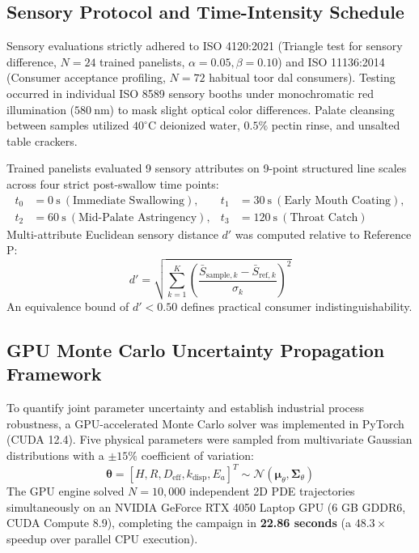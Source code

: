 \documentclass[10pt,a4paper]{article}
\begin{document}
\subsection{Sensory Protocol and Time-Intensity Schedule}
Sensory evaluations strictly adhered to ISO 4120:2021 (Triangle test for sensory difference, $N = 24$ trained panelists, $\alpha = 0.05, \beta = 0.10$) and ISO 11136:2014 (Consumer acceptance profiling, $N = 72$ habitual toor dal consumers). Testing occurred in individual ISO 8589 sensory booths under monochromatic red illumination ($580\ \mathrm{nm}$) to mask slight optical color differences. Palate cleansing between samples utilized $40^\circ\mathrm{C}$ deionized water, $0.5\%$ pectin rinse, and unsalted table crackers.

Trained panelists evaluated 9 sensory attributes on 9-point structured line scales across four strict post-swallow time points:
\begin{align*}
t_0 &= 0\ \mathrm{s}\ (\text{Immediate Swallowing}), &t_1 &= 30\ \mathrm{s}\ (\text{Early Mouth Coating}), \\
t_2 &= 60\ \mathrm{s}\ (\text{Mid-Palate Astringency}), &t_3 &= 120\ \mathrm{s}\ (\text{Throat Catch})
\end{align*}
Multi-attribute Euclidean sensory distance $d'$ was computed relative to Reference P:
\begin{equation}
d' = \sqrt{ \sum_{k=1}^K \left( \frac{\bar{S}_{\mathrm{sample},k} - \bar{S}_{\mathrm{ref},k}}{\sigma_k} \right)^2 }
\end{equation}
An equivalence bound of $d' < 0.50$ defines practical consumer indistinguishability.

\subsection{GPU Monte Carlo Uncertainty Propagation Framework}
To quantify joint parameter uncertainty and establish industrial process robustness, a GPU-accelerated Monte Carlo solver was implemented in PyTorch (CUDA 12.4). Five physical parameters were sampled from multivariate Gaussian distributions with a $\pm 15\%$ coefficient of variation:
\begin{equation}
\mathbf{\theta} = \left[ H, R, D_{\mathrm{eff}}, k_{\mathrm{disp}}, E_a \right]^T \sim \mathcal{N}\left( \mathbf{\mu}_{\theta}, \mathbf{\Sigma}_{\theta} \right)
\end{equation}
The GPU engine solved $N = 10,000$ independent 2D PDE trajectories simultaneously on an NVIDIA GeForce RTX 4050 Laptop GPU (6 GB GDDR6, CUDA Compute 8.9), completing the campaign in \textbf{22.86 seconds} (a $48.3\times$ speedup over parallel CPU execution).
\end{document}

